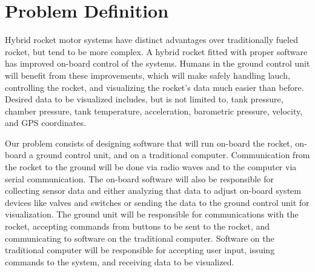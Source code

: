 \documentclass[10pt,draftclsnofoot,onecolumn]{IEEEtran}
\begin{document}
\section{Problem Definition}
Hybrid rocket motor systems have distinct advantages over traditionally fueled rocket, but tend to be more complex. A hybrid rocket fitted with proper software has improved on-board control of the systems. Humans in the ground control unit will benefit from these improvements, which will make safely handling lauch, controlling the rocket, and visualizing the rocket's data much easier than before.  Desired data to be visualized includes, but is not limited to, tank pressure, chamber pressure, tank temperature, acceleration, barometric pressure, velocity, and GPS coordinates.\par
Our problem consists of designing software that will run on-board the rocket, on-board a ground control unit, and on a traditional computer. Communication from the rocket to the ground will be done via radio waves and to the computer via serial communication. The on-board software will also be responsible for collecting sensor data and either analyzing that data to adjust on-board system devices like valves and switches or sending the data to the ground control unit for visualization.  The ground unit will  be responsible for communications with the rocket, accepting commands from buttons to be sent to the rocket, and communicating to software on the traditional computer. Software on the traditional computer will be responsible for accepting user input, issuing commands to the system, and receiving data to be visualized.
\end{document}
